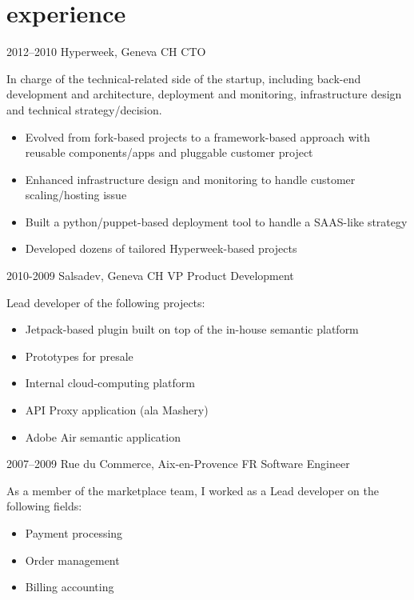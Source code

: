 \documentclass[]{friggeri}
\begin{document}
\section{experience}

\begin{entrylist}
  \entry
    {2012–2010}
    {Hyperweek, Geneva CH}
    {CTO}
    {In charge of the technical-related side of the startup, including back-end development and architecture, deployment and monitoring, infrastructure design and technical strategy/decision.
    \begin{itemize}
    \item Evolved from fork-based projects to a framework-based approach with reusable components/apps and pluggable customer project
    \item Enhanced infrastructure design and monitoring to handle customer scaling/hosting issue
    \item Built a python/puppet-based deployment tool to handle a SAAS-like strategy
    \item Developed dozens of tailored Hyperweek-based projects
    \end{itemize}}
  \entry
    {2010-2009}
    {Salsadev, Geneva CH}
    {VP Product Development}
    {Lead developer of the following projects:
    \begin{itemize}
    \item Jetpack-based plugin built on top of the in-house semantic platform
    \item Prototypes for presale
    \item Internal cloud-computing platform
    \item API Proxy application (ala Mashery)
    \item Adobe Air semantic application
    \end{itemize}}
  \entry
    {2007–2009}
    {Rue du Commerce, Aix-en-Provence FR}
    {Software Engineer}
    {As a member of the marketplace team, I worked as a Lead developer on the following fields:
    \begin{itemize}
    \item Payment processing
    \item Order management
    \item Billing accounting
    \end{itemize}}
\end{entrylist}

\clearpage
\end{document}
